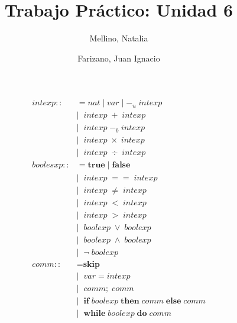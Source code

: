\documentclass[11pt]{article}
\title{Trabajo Práctico: Unidad 6}
\author{Mellino, Natalia \and Farizano, Juan Ignacio}
\date{}
\begin{document}
\maketitle



\begin{align*}
intexp ::&= nat \; | \; var \; | \; -_u \; intexp \\
         &| \;\; intexp \; +  \; intexp \\
         &| \;\; intexp \; -_b  \; intexp \\
         &| \;\; intexp \; \times  \; intexp \\
         &| \;\; intexp \; \div  \; intexp \\
boolesxp ::&= \textbf{true} \; | \; \textbf{false} \\
           &| \;\; intexp \; ==  \; intexp \\
           &| \;\; intexp \; \neq  \; intexp \\
           &| \;\; intexp \; <  \; intexp \\
           &| \;\; intexp \; >  \; intexp \\
           &| \;\; boolexp \; \lor  \; boolexp \\
           &| \;\; boolexp \; \land  \; boolexp \\
           &| \;\; \neg \; boolexp \\
comm ::&= \textbf{skip} \\
       &| \;\; var = intexp \\
       &| \;\; comm; \; comm \\
       &| \;\; \textbf{if} \; boolexp \; \textbf{then} \; comm \; \textbf{else} \; comm \\
       &| \; \; \textbf{while} \; boolexp \; \textbf{do} \; comm
\end{align*} 

\end{document}
